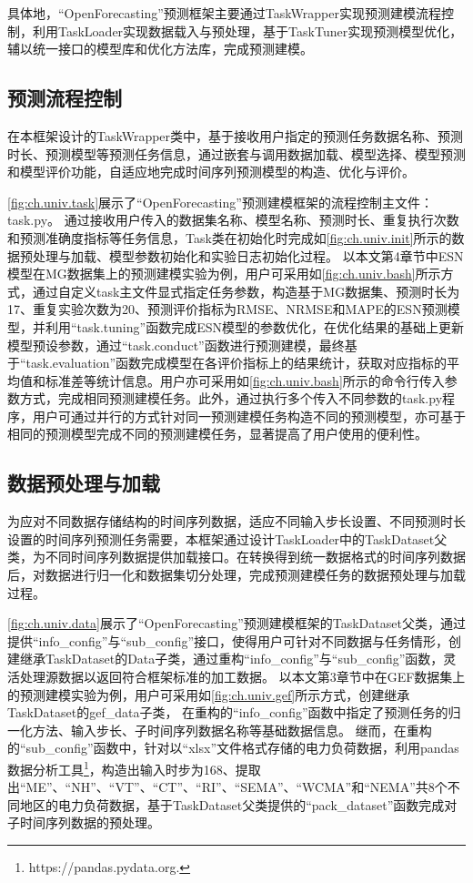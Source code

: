 具体地，“OpenForecasting”预测框架主要通过TaskWrapper实现预测建模流程控制，利用TaskLoader实现数据载入与预处理，基于TaskTuner实现预测模型优化，辅以统一接口的模型库和优化方法库，完成预测建模。

\subsection{预测流程控制}
在本框架设计的TaskWrapper类中，基于接收用户指定的预测任务数据名称、预测时长、预测模型等预测任务信息，通过嵌套与调用数据加载、模型选择、模型预测和模型评价功能，自适应地完成时间序列预测模型的构造、优化与评价。


\autoref{fig:ch.univ.task}展示了“OpenForecasting”预测建模框架的流程控制主文件：task.py。
通过接收用户传入的数据集名称、模型名称、预测时长、重复执行次数和预测准确度指标等任务信息，Task类在初始化时完成如\autoref{fig:ch.univ.init}所示的数据预处理与加载、模型参数初始化和实验日志初始化过程。
以本文第4章节中ESN模型在MG数据集上的预测建模实验为例，用户可采用如\autoref{fig:ch.univ.bash}所示方式，通过自定义task主文件显式指定任务参数，构造基于MG数据集、预测时长为17、重复实验次数为20、预测评价指标为RMSE、NRMSE和MAPE的ESN预测模型，并利用“task.tuning”函数完成ESN模型的参数优化，在优化结果的基础上更新模型预设参数，通过“task.conduct”函数进行预测建模，最终基于“task.evaluation”函数完成模型在各评价指标上的结果统计，获取对应指标的平均值和标准差等统计信息。用户亦可采用如\autoref{fig:ch.univ.bash}所示的命令行传入参数方式，完成相同预测建模任务。此外，通过执行多个传入不同参数的task.py程序，用户可通过并行的方式针对同一预测建模任务构造不同的预测模型，亦可基于相同的预测模型完成不同的预测建模任务，显著提高了用户使用的便利性。

\subsection{数据预处理与加载}
为应对不同数据存储结构的时间序列数据，适应不同输入步长设置、不同预测时长设置的时间序列预测任务需要，本框架通过设计TaskLoader中的TaskDataset父类，为不同时间序列数据提供加载接口。在转换得到统一数据格式的时间序列数据后，对数据进行归一化和数据集切分处理，完成预测建模任务的数据预处理与加载过程。


\autoref{fig:ch.univ.data}展示了“OpenForecasting”预测建模框架的TaskDataset父类，通过提供“info_config”与“sub_config”接口，使得用户可针对不同数据与任务情形，创建继承TaskDataset的Data子类，通过重构“info_config”与“sub_config”函数，灵活处理源数据以返回符合框架标准的加工数据。
以本文第3章节中在GEF数据集上的预测建模实验为例，用户可采用如\autoref{fig:ch.univ.gef}所示方式，创建继承TaskDataset的gef_data子类，
在重构的“info_config”函数中指定了预测任务的归一化方法、输入步长、子时间序列数据名称等基础数据信息。
继而，在重构的“sub_config”函数中，针对以“xlsx”文件格式存储的电力负荷数据，利用pandas数据分析工具\footnote{https://pandas.pydata.org.}，构造出输入时步为168、提取出“ME”、“NH”、“VT”、“CT”、“RI”、“SEMA”、“WCMA”和“NEMA”共8个不同地区的电力负荷数据，基于TaskDataset父类提供的“pack_dataset”函数完成对子时间序列数据的预处理。


